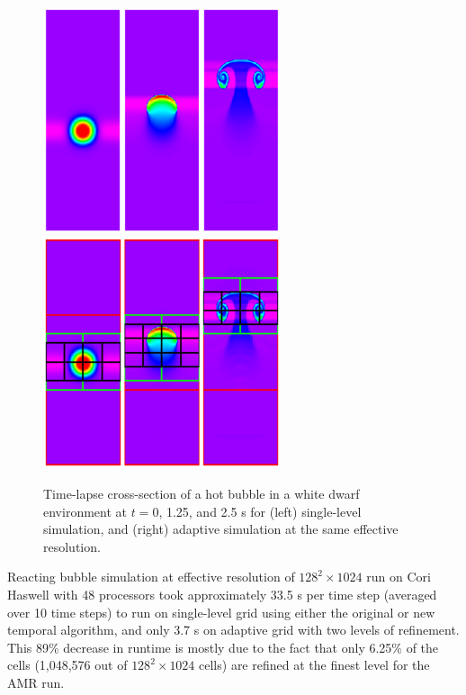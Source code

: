 \begin{figure}[htb]
\begin{center}
\includegraphics[width=2.75in]{./figs/reacting_bubble_result} 
$\qquad$
\includegraphics[width=2.75in]{./figs/reacting_bubble_amr_result}
\caption{\label{fig:bubble_results} Time-lapse cross-section of a hot bubble in a white dwarf environment at 
         $t = 0$, 1.25, and 2.5 s for (left) single-level simulation, and 
         (right) adaptive simulation at the same effective resolution.}
\end{center}
\end{figure}

Reacting bubble simulation at effective resolution of $128^2 \times 1024$ run on Cori Haswell with 48 processors took approximately 33.5 s per time step (averaged over 10 time steps) to run on single-level grid using either the original or new temporal algorithm, and only 3.7 s on adaptive grid with two levels of refinement. This 89\% decrease in runtime is mostly due to the fact that only 6.25\% of the cells (1,048,576 out of $128^2 \times 1024$ cells) are refined at the finest level for the AMR run. 




